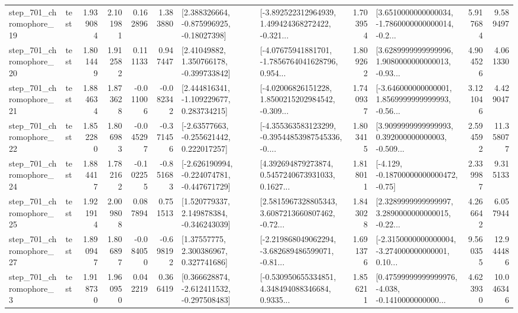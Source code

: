 \begin{tabular}{llrrrrllrlrr}
  step\_701\_chromophore\_19 &      test &      1.939084 &    2.101981 &      0.162896 &  1.383880 &    [2.388326664, -0.875996925, -0.18027398] &  [-3.892522312964939, 1.499424368272422, -0.321... &       1.703954 &  [3.6510000000000034, -1.7860000000000014, -0.2... &            5.917684 &          9.589497 \\
  step\_701\_chromophore\_20 &      test &      1.801449 &    1.912582 &      0.111133 &  0.947447 &     [2.41049882, 1.350766178, -0.399733842] &  [-4.07675941881701, -1.7856764041628796, 0.954... &       1.809262 &  [3.6289999999999996, 1.9080000000000013, -0.93... &            4.904526 &          4.061330 \\
  step\_701\_chromophore\_21 &      test &      1.884634 &    1.873628 &     -0.011006 & -0.082342 &    [2.444816341, -1.109229677, 0.283734215] &  [-4.02006826151228, 1.8500215202984542, -0.309... &       1.740937 &  [-3.646000000000001, 1.8569999999999993, -0.56... &            3.121046 &          4.429047 \\
  step\_701\_chromophore\_22 &      test &      1.852280 &    1.806983 &     -0.045297 & -0.371456 &    [-2.63577663, -0.255621442, 0.222017257] &  [-4.355363583123299, -0.39544853987545336, -0.... &       1.803415 &  [3.9099999999999993, 0.392000000000003, -0.509... &            2.594592 &         11.358077 \\
  step\_701\_chromophore\_24 &      test &      1.884417 &    1.782162 &     -0.102255 & -0.851683 &  [-2.626190994, -0.224074781, -0.447671729] &  [4.392694879273874, 0.5457240673931033, 0.1627... &       1.818011 &              [-4.129, -0.18700000000000472, -0.75] &            2.339987 &          9.315133 \\
  step\_701\_chromophore\_25 &      test &      1.921914 &    2.009808 &      0.087894 &  0.751513 &    [1.520779337, 2.149878384, -0.346243039] &  [2.5815967328805343, 3.6087213660807462, -0.72... &       1.843028 &  [2.3289999999999997, 3.2890000000000015, -0.22... &            4.266642 &          6.057944 \\
  step\_701\_chromophore\_27 &      test &      1.890947 &    1.806897 &     -0.084050 & -0.698192 &      [1.37557775, 2.300386967, 0.327741686] &  [-2.219868049062294, -3.682689486599071, -0.81... &       1.691376 &  [-2.3150000000000004, -3.274000000000001, 0.10... &            9.560355 &         12.944486 \\
   step\_701\_chromophore\_3 &      test &      1.918730 &    1.960950 &      0.042219 &  0.366419 &   [0.366628874, -2.612411532, -0.297508483] &  [-0.530950655334851, 4.348494088346684, 0.9335... &       1.856211 &  [0.47599999999999976, -4.038, -0.1410000000000... &            4.623930 &         10.046346 \\

\end{tabular}
